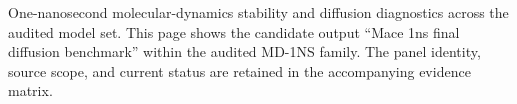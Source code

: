 One-nanosecond molecular-dynamics stability and diffusion diagnostics across the audited model set. This page shows the candidate output ``Mace 1ns final diffusion benchmark'' within the audited MD-1NS family. The panel identity, source scope, and current status are retained in the accompanying evidence matrix.
